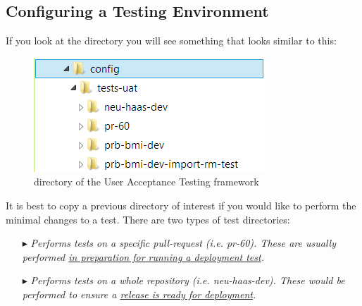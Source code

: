 \subsection{Configuring a Testing Environment}

If you look at the  directory you will see something that looks similar to this:

\begin{figure}[!h] %
\vspace{10mm}
\begin{center}
\includegraphics[scale=1]{figures/uat-config-dir.png}
\end{center}
\caption{ directory of the User Acceptance Testing framework}
\label{fig:uat-root-dir}
\end{figure}

It is best to copy a previous directory of interest if you would like to perform the minimal changes to a test.  There are two types of test directories: \\

\begin{itemize}
\item[\index{\code{Pull-Request Test}}\code{Pull-Request Test }$\blacktriangleright$\hspace{-12mm}] \hspace{10mm}\emph{Performs tests on a specific pull-request (i.e. \emph{pr-60}).  These are usually performed \underline{in preparation for running a deployment test}.} \\

\item[\index{\code{Repository Test}}\code{Repository Test }$\blacktriangleright$\hspace{-12mm}] \hspace{10mm}\emph{Performs tests on a whole repository (i.e. \emph{neu-haas-dev}).  These would be performed to ensure a \underline{release is ready for deployment}.} \\

\end{itemize}

